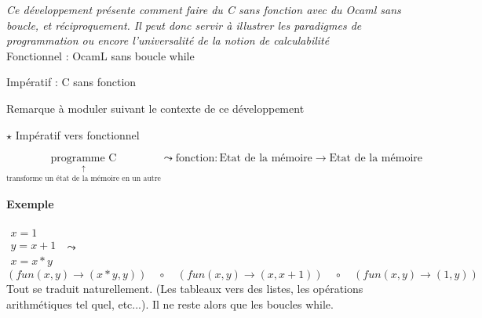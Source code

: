 
\textit{Ce développement présente comment faire du C sans fonction avec du Ocaml sans boucle, et réciproquement. Il peut donc servir à illustrer les paradigmes de programmation ou encore l'universalité de la notion de calculabilité}\\

Fonctionnel : OcamL sans boucle while

Impératif : C sans fonction

\begin{com}
	Remarque à moduler suivant le contexte de ce développement
\end{com}


$\star$ Impératif vers fonctionnel

$$ \underset{\text{transforme un état de la mémoire en un autre}}{\underset{\uparrow}{\text{programme C}}} \leadsto \text{fonction} : \text{Etat de la mémoire} \to \text{Etat de la mémoire} $$

\paragraph{Exemple}
$\begin{array}{l}
	x = 1\\
	y = x + 1\\
	x = x*y \end{array}$
$\leadsto$ 
$\left( fun(x,y) \to (x*y, y)\right) \quad \circ \quad \left( fun(x,y) \to (x, x+1)\right)
	\quad \circ \quad \left( fun(x,y) \to (1, y)\right)$\\

Tout se traduit naturellement. (Les tableaux vers des listes, les opérations arithmétiques tel quel, etc...). Il ne reste alors que les boucles while.\\

